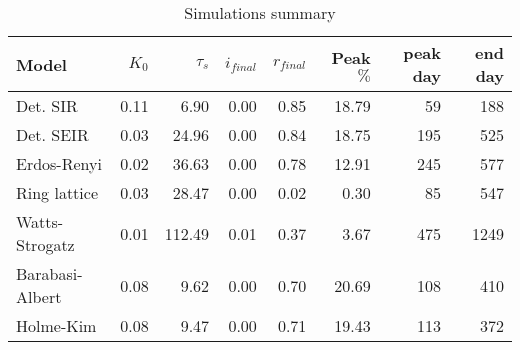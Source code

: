 \begin{table}
\centering
\caption{Simulations summary}
\label{tab:results}
\begin{tabular}{lrrrrrrr}
\toprule
           Model & $K_{0}$ & $\tau_{s}$ & $i_{final}$ & $r_{final}$ & Peak $\%$ & peak day & end day \\
\midrule
        Det. SIR &    0.11 &      6.90 &        0.00 &        0.85 &     18.79 &       59 &     188 \\
       Det. SEIR &    0.03 &     24.96 &        0.00 &        0.84 &     18.75 &      195 &     525 \\
     Erdos-Renyi &    0.02 &     36.63 &        0.00 &        0.78 &     12.91 &      245 &     577 \\
    Ring lattice &    0.03 &     28.47 &        0.00 &        0.02 &      0.30 &       85 &     547 \\
  Watts-Strogatz &    0.01 &    112.49 &        0.01 &        0.37 &      3.67 &      475 &    1249 \\
 Barabasi-Albert &    0.08 &      9.62 &        0.00 &        0.70 &     20.69 &      108 &     410 \\
       Holme-Kim &    0.08 &      9.47 &        0.00 &        0.71 &     19.43 &      113 &     372 \\
\bottomrule
\end{tabular}
\end{table}
